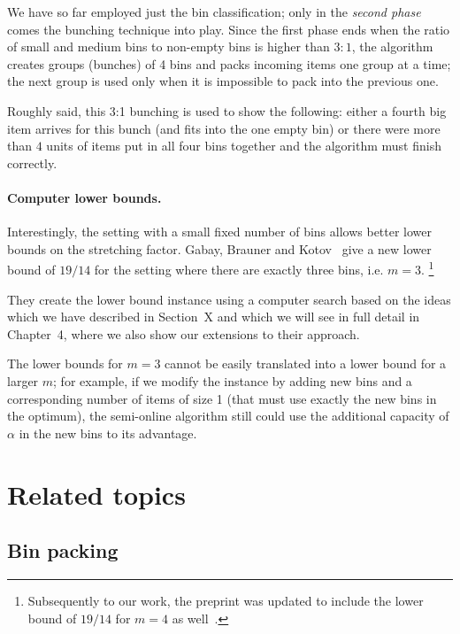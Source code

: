 We have so far employed just the bin classification; only in the
\emph{second phase} comes the bunching technique into play. Since the
first phase ends when the ratio of small and medium bins to non-empty
bins is higher than $3:1$, the algorithm creates groups (bunches) of 4
bins and packs incoming items one group at a time; the next group is
used only when it is impossible to pack into the previous one.

Roughly said, this 3:1 bunching is used to show the following: either
a fourth big item arrives for this bunch (and fits into the one empty
bin) or there were more than $4$ units of items put in all four bins
together and the algorithm must finish correctly.


\paragraph{Computer lower bounds.} Interestingly, the setting with a
small fixed number of bins allows better lower bounds on the
stretching factor. Gabay, Brauner and Kotov~\cite{gabay2013lbv2} give
a new lower bound of $19/14$ for the setting where there are exactly
three bins, i.e. $m=3$. \footnote{Subsequently to our work, the
preprint \cite{gabay2013lbv2} was updated to include the lower bound
of $19/14$ for $m=4$ as well~\cite{gabay2013lbv3}.}

They create the lower bound instance using a computer search based on
the ideas which we have described in Section~X and which we will see
in full detail in Chapter~4, where we also show our extensions to
their approach.

The lower bounds for $m=3$ cannot be easily translated into a lower
bound for a larger $m$; for example, if we modify the instance by
adding new bins and a corresponding number of items of size 1 (that
must use exactly the new bins in the optimum), the semi-online
algorithm still could use the additional capacity of $\alpha$ in the
new bins to its advantage.

\section{Related topics}

\subsection{Bin packing}

